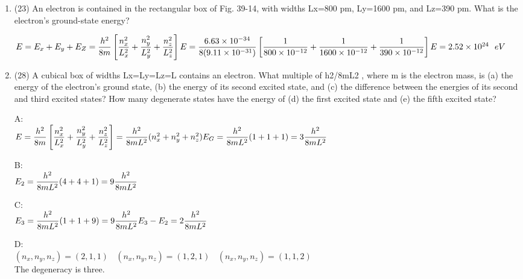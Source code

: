 \documentclass[fleqn]{article}
\begin{document}
\begin{enumerate}
    \item (23) An electron is contained in the rectangular box of Fig. 39-14, with widths Lx=800 pm, Ly=1600 pm, and Lz=390 pm. What
    is the electron’s ground-state energy?

      \textcolor{hwColor}{
        $
          E=E_x+E_y+E_Z=\dfrac{h^2}{8m}\left[\dfrac{n^2_x}{L^2_x}+\dfrac{n^2_y}{L^2_y}+\dfrac{n^2_z}{L^2_z}\right] \\
          \\
          E=\dfrac{6.63 \times 10^{-34}}{8(9.11 \times 10^{-31})}\left[\dfrac{1}{800 \times 10^{-12}}+\dfrac{1}{1600 \times 10^{-12}}+\dfrac{1}{390 \times 10^{-12}}\right] \\
          \\
          E=2.52 \times 10^{24} ~~ eV
        $
      }

    \item (28) A cubical box of widths Lx=Ly=Lz=L contains an electron. What multiple of h2/8mL2 , where m is the electron mass, is
    (a) the energy of the electron’s ground state, (b) the energy of its second excited state, and (c) the difference between the energies of its
    second and third excited states? How many degenerate states have the energy of (d) the first excited state and (e) the fifth excited state?

      \textcolor{hwColor}{
        A: \\
        $
          E=\dfrac{h^2}{8m}\left[\dfrac{n^2_x}{L^2_x}+\dfrac{n^2_y}{L^2_y}+\dfrac{n^2_z}{L^2_z}\right]=\dfrac{h^2}{8mL^2}(n^2_x+n^2_y+n^2_z) \\
          \\
          E_G=\dfrac{h^2}{8mL^2}(1+1+1)=3\dfrac{h^2}{8mL^2} \\
        $ \\
      }

      \textcolor{hwColor}{
        B: \\
        $
          E_2=\dfrac{h^2}{8mL^2}(4+4+1)=9\dfrac{h^2}{8mL^2} \\
        $ \\
      }

      \textcolor{hwColor}{
        C: \\
        $
          E_3=\dfrac{h^2}{8mL^2}(1+1+9)=9\dfrac{h^2}{8mL^2} \\
          \\
          E_3-E_2=2\dfrac{h^2}{8mL^2}
        $ \\
      }

      \textcolor{hwColor}{
        D: \\
        $
          (n_x, n_y, n_z)=(2,1,1) ~~~~ (n_x, n_y, n_z)=(1,2,1) ~~~~ (n_x, n_y, n_z)=(1,1,2) ~~~~
        $ \\
        The degeneracy is three. 
      }


\end{enumerate}
\end{document}
